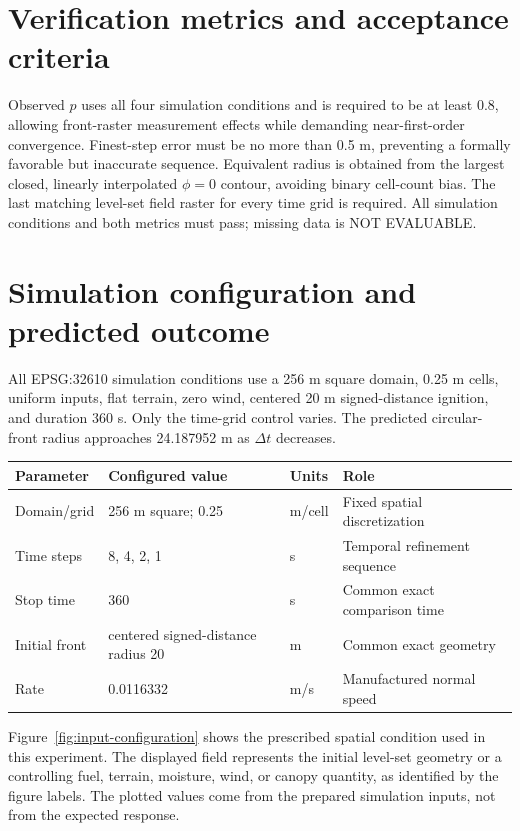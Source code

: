 \section{Verification metrics and acceptance criteria}

Observed \(p\) uses all four simulation conditions and is required to be at least 0.8, allowing front-raster measurement effects while demanding near-first-order convergence. Finest-step error must be no more than 0.5 m, preventing a formally favorable but inaccurate sequence. Equivalent radius is obtained from the largest closed, linearly interpolated \(\phi=0\) contour, avoiding binary cell-count bias. The last matching level-set field raster for every time grid is required. All simulation conditions and both metrics must pass; missing data is NOT EVALUABLE.

\section{Simulation configuration and predicted outcome}

All EPSG:32610 simulation conditions use a 256 m square domain, 0.25 m cells, uniform inputs, flat terrain, zero wind, centered 20 m signed-distance ignition, and duration 360 s. Only the time-grid control varies. The predicted circular-front radius approaches 24.187952 m as \(\Delta t\) decreases.

\begin{center}\begin{tabular}{p{}p{}p{}p{}}\toprule
Parameter & Configured value & Units & Role \\
\midrule Domain/grid & 256 m square; 0.25 & m/cell & Fixed spatial discretization \\
Time steps & 8, 4, 2, 1 & s & Temporal refinement sequence \\
Stop time & 360 & s & Common exact comparison time \\
Initial front & centered signed-distance radius 20 & m & Common exact geometry \\
Rate & 0.0116332 & m/s & Manufactured normal speed \\
\bottomrule\end{tabular}\end{center}

Figure~\ref{fig:input-configuration} shows the prescribed spatial condition used in this experiment. The displayed field represents the initial level-set geometry or a controlling fuel, terrain, moisture, wind, or canopy quantity, as identified by the figure labels. The plotted values come from the prepared simulation inputs, not from the expected response.

